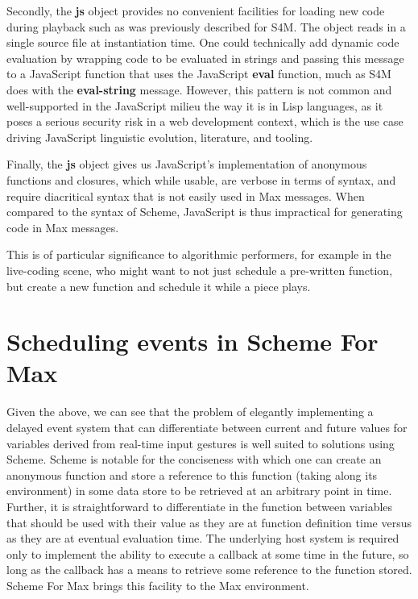 \documentclass[acmsmall, anonymous, review]{acmart}
\begin{document}
Secondly, the \textbf{js} object provides no convenient facilities for loading new code
during playback such as was previously described for S4M.
The object reads in a single source file at instantiation time.
One could technically add dynamic code evaluation by wrapping
code to be evaluated in strings and passing this message to a JavaScript function
that uses the JavaScript \textbf{eval} function, much as S4M does with the
\textbf{eval-string} message. However, this pattern is not common and well-supported
in the JavaScript milieu the way it is in Lisp languages, as it poses a serious security risk in a 
web development context, which is the use case driving JavaScript linguistic
evolution, literature, and tooling.

Finally, the \textbf{js} object gives us JavaScript's implementation of anonymous functions
and closures, which while usable, are verbose in terms of syntax, and require
diacritical syntax that is not easily used in Max messages. When compared to the syntax
of Scheme, JavaScript is thus impractical for generating code in Max messages.

This is of particular significance to algorithmic performers, 
for example in the live-coding scene, who might
want to not just schedule a pre-written function, but create a new function 
and schedule it while a piece plays.


\section{Scheduling events in Scheme For Max}

Given the above, we can see that the problem of elegantly implementing 
a delayed event system that can differentiate between current and future values
for variables derived from real-time input gestures is well suited to solutions 
using Scheme. Scheme is notable for the conciseness with which one can create an anonymous function
and store a reference to this function (taking along its environment) in some data
store to be retrieved at an arbitrary point in time. Further, it is straightforward
to differentiate in the function between variables that should
be used with their value as they are at function definition time versus
as they are at eventual evaluation time. The underlying host system is required only to 
implement the ability to execute a callback at some time in the future, so long as 
the callback has a means to retrieve some reference to the function stored.
Scheme For Max brings this facility to the Max environment.
\end{document}
